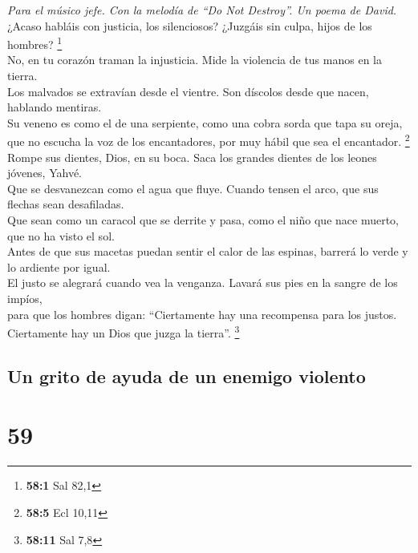 \emph{Para el músico jefe. Con la melodía de ``Do Not Destroy''. Un
poema de David.}\\
 ¿Acaso habláis con justicia, los silenciosos? ¿Juzgáis
sin culpa, hijos de los hombres? \footnote{\textbf{58:1} Sal 82,1}\\
 No, en tu corazón traman la injusticia. Mide la violencia
de tus manos en la tierra.\\
 Los malvados se extravían desde el vientre. Son díscolos
desde que nacen, hablando mentiras.\\
 Su veneno es como el de una serpiente, como una cobra
sorda que tapa su oreja,\\
 que no escucha la voz de los encantadores, por muy hábil
que sea el encantador. \footnote{\textbf{58:5} Ecl 10,11}\\
 Rompe sus dientes, Dios, en su boca. Saca los grandes
dientes de los leones jóvenes, Yahvé.\\
 Que se desvanezcan como el agua que fluye. Cuando tensen
el arco, que sus flechas sean desafiladas.\\
 Que sean como un caracol que se derrite y pasa, como el
niño que nace muerto, que no ha visto el sol.\\
 Antes de que sus macetas puedan sentir el calor de las
espinas, barrerá lo verde y lo ardiente por igual.\\
 El justo se alegrará cuando vea la venganza. Lavará sus
pies en la sangre de los impíos,\\
 para que los hombres digan: ``Ciertamente hay una
recompensa para los justos. Ciertamente hay un Dios que juzga la
tierra''. \footnote{\textbf{58:11} Sal 7,8}

\hypertarget{un-grito-de-ayuda-de-un-enemigo-violento}{%
\subsection{Un grito de ayuda de un enemigo
violento}\label{un-grito-de-ayuda-de-un-enemigo-violento}}

\hypertarget{section-57}{%
\section{59}\label{section-57}}


